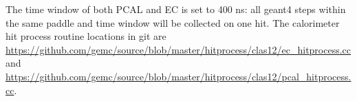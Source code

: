 The time window of both PCAL and EC is set to 400 ns: all geant4 steps within the same paddle and time window will be collected on one hit.
The calorimeter hit process routine locations in git are \url{https://github.com/gemc/source/blob/master/hitprocess/clas12/ec_hitprocess.cc} and
\url{https://github.com/gemc/source/blob/master/hitprocess/clas12/pcal_hitprocess.cc}.

